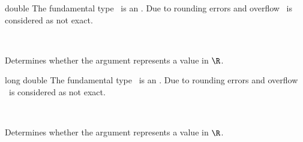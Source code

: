 \begin{ccRefClass}{double}
\ccDefinition
The fundamental type \ccRefName\ is an  
. Due to rounding errors and overflow \ccRefName\ is 
considered as not exact.
 
\ccIsModel
{}\\

\ccQueryFunctions
{}
        { Determines whether the argument represents a value in $\R$. }

\end{ccRefClass}



\begin{ccRefClass}{long double}
\ccDefinition
The fundamental type \ccRefName\ is an  
. Due to rounding errors and overflow \ccRefName\ is 
considered as not exact.
 
\ccIsModel
{}\\

\ccQueryFunctions
{}
        { Determines whether the argument represents a value in $\R$. }

\end{ccRefClass}

